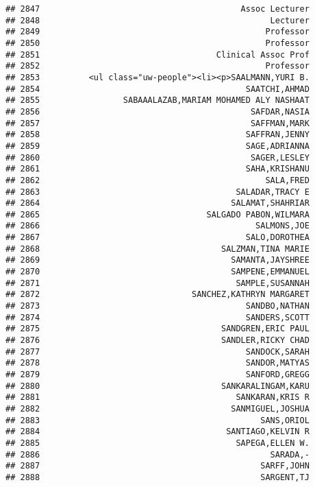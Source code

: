 \documentclass[
]{article}
\begin{document}
\begin{verbatim}
## 2847                                         Assoc Lecturer
## 2848                                               Lecturer
## 2849                                              Professor
## 2850                                              Professor
## 2851                                    Clinical Assoc Prof
## 2852                                              Professor
## 2853          <ul class="uw-people"><li><p>SAALMANN,YURI B.
## 2854                                          SAATCHI,AHMAD
## 2855                 SABAAALAZAB,MARIAM MOHAMED ALY NASHAAT
## 2856                                           SAFDAR,NASIA
## 2857                                           SAFFMAN,MARK
## 2858                                          SAFFRAN,JENNY
## 2859                                          SAGE,ADRIANNA
## 2860                                           SAGER,LESLEY
## 2861                                          SAHA,KRISHANU
## 2862                                              SALA,FRED
## 2863                                        SALADAR,TRACY E
## 2864                                       SALAMAT,SHAHRIAR
## 2865                                  SALGADO PABON,WILMARA
## 2866                                            SALMONS,JOE
## 2867                                          SALO,DOROTHEA
## 2868                                     SALZMAN,TINA MARIE
## 2869                                       SAMANTA,JAYSHREE
## 2870                                       SAMPENE,EMMANUEL
## 2871                                        SAMPLE,SUSANNAH
## 2872                               SANCHEZ,KATHRYN MARGARET
## 2873                                          SANDBO,NATHAN
## 2874                                          SANDERS,SCOTT
## 2875                                     SANDGREN,ERIC PAUL
## 2876                                     SANDLER,RICKY CHAD
## 2877                                          SANDOCK,SARAH
## 2878                                          SANDOR,MATYAS
## 2879                                          SANFORD,GREGG
## 2880                                     SANKARALINGAM,KARU
## 2881                                        SANKARAN,KRIS R
## 2882                                       SANMIGUEL,JOSHUA
## 2883                                             SANS,ORIOL
## 2884                                      SANTIAGO,KELVIN R
## 2885                                        SAPEGA,ELLEN W.
## 2886                                               SARADA,-
## 2887                                             SARFF,JOHN
## 2888                                             SARGENT,TJ

\end{verbatim}
\end{document}
